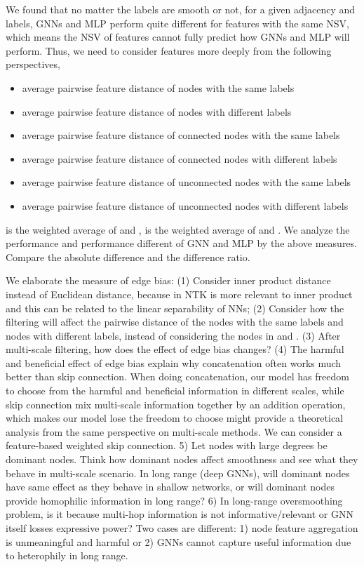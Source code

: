 \documentclass{article}
\newcommand{\0}{{\boldsymbol{0}}}
\newcommand{\6}{{\partial}}
\newcommand{\8}{{\infty}}
\newcommand{\4}{{\nabla}}
\begin{document}
We found that no matter the labels are smooth or not, for a given adjacency and labels, GNNs and MLP perform quite different for features with the same NSV, which means the NSV of features cannot fully predict how GNNs and MLP will perform. Thus, we need to consider features more deeply from the following perspectives,
\begin{itemize}
    \item  average pairwise feature distance of nodes with the same labels
    \item  average pairwise feature distance of nodes with different labels
    \item  average pairwise feature distance of connected nodes with the same labels
    \item  average pairwise feature distance of connected nodes with different labels
    \item  average pairwise feature distance of unconnected nodes with the same labels
    \item  average pairwise feature distance of unconnected nodes with different labels
\end{itemize}
 is the weighted average of  and  ,  is the weighted average of  and . We analyze the performance and performance different of GNN and MLP by the above measures. Compare the absolute difference and the difference ratio.

We elaborate the measure of edge bias: (1) Consider inner product distance instead of Euclidean distance, because in NTK is more relevant to inner product and this can be related to the linear separability of NNs; (2) Consider how the filtering will affect the pairwise distance of the nodes with the same labels and nodes with different labels, instead of considering the nodes in  and . (3) After multi-scale filtering, how does the effect of edge bias changes? (4) The harmful and beneficial effect of edge bias explain why concatenation often works much better than skip connection. When doing concatenation, our model has freedom to choose from the harmful and beneficial information in different scales, while skip connection mix multi-scale information together by an addition operation, which makes our model lose the freedom to choose \cite{oono2020optimization} might provide a theoretical analysis from the same perspective on multi-scale methods. We can consider a feature-based weighted skip connection. 5) Let nodes with large degrees be dominant nodes. Think how dominant nodes affect smoothness and see what they behave in multi-scale scenario. In long range (deep GNNs), will dominant nodes have same effect as they behave in shallow networks, or will dominant nodes provide homophilic information in long range? 6) In long-range oversmoothing problem, is it because multi-hop information is not informative/relevant or GNN itself losses expressive power? Two cases are different: 1) node feature aggregation is unmeaningful and harmful or 2) GNNs cannot capture useful information due to heterophily in long range.  
\fi
\end{document}
